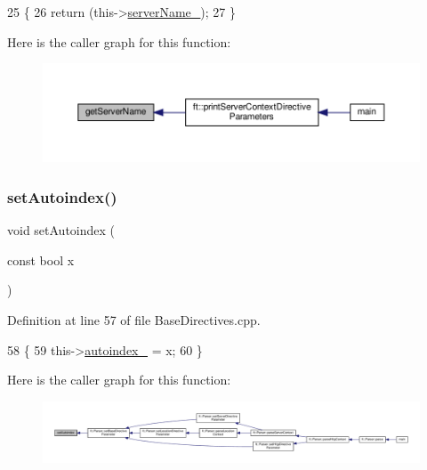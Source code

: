 \begin{DoxyCode}
25     \{
26         \textcolor{keywordflow}{return} (this->\hyperlink{classft_1_1_server_block_adc26ae834350b4c964d4198e7a431e90}{serverName\_});
27     \}
\end{DoxyCode}
Here is the caller graph for this function\+:
\nopagebreak
\begin{figure}[H]
\begin{center}
\leavevmode
\includegraphics[width=350pt]{classft_1_1_server_block_aa14d06f644ee8148fa9e2ee53d9625f9_icgraph}
\end{center}
\end{figure}
\mbox{\label{classft_1_1_base_directives_ae7293c7bbf34e9bdc60c540dccd53342}} 
\subsubsection{\texorpdfstring{set\+Autoindex()}{setAutoindex()}}
{\footnotesize\ttfamily void set\+Autoindex (\begin{DoxyParamCaption}\item[{const bool}]{x }\end{DoxyParamCaption})\hspace{0.3cm}{\ttfamily [inherited]}}



Definition at line 57 of file Base\+Directives.\+cpp.


\begin{DoxyCode}
58     \{
59         this->\hyperlink{classft_1_1_base_directives_a4ebffbe32f50a462afa139c6f03c1a4f}{autoindex\_} = x;
60     \}
\end{DoxyCode}
Here is the caller graph for this function\+:
\nopagebreak
\begin{figure}[H]
\begin{center}
\leavevmode
\includegraphics[width=350pt]{classft_1_1_base_directives_ae7293c7bbf34e9bdc60c540dccd53342_icgraph}
\end{center}
\end{figure}
\mbox{\label{classft_1_1_base_directives_a39bf4922f3236043c76beaffaa557a3b}} 
